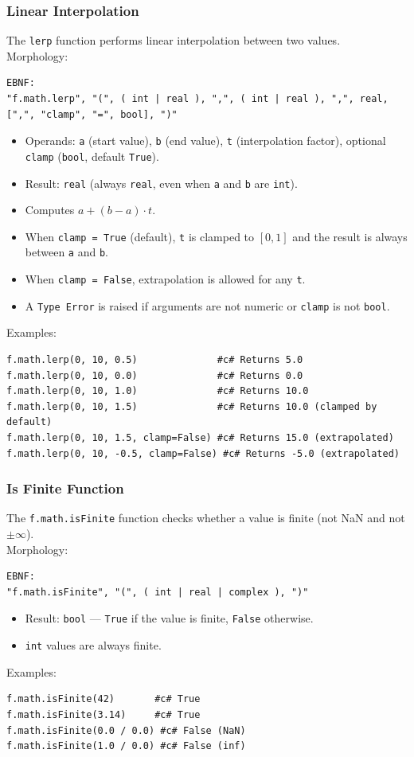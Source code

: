 \subsubsection{Linear Interpolation}
The \texttt{lerp} function performs linear interpolation between two values. \\
Morphology:
\begin{verbatim}
EBNF:
"f.math.lerp", "(", ( int | real ), ",", ( int | real ), ",", real, [",", "clamp", "=", bool], ")"
\end{verbatim}
\begin{itemize}
\item Operands: \texttt{a} (start value), \texttt{b} (end value), \texttt{t} (interpolation factor), optional \texttt{clamp} (\texttt{bool}, default \texttt{True}).
\item Result: \texttt{real} (always \texttt{real}, even when \texttt{a} and \texttt{b} are \texttt{int}).
\item Computes $a + (b - a) \cdot t$.
\item When \texttt{clamp = True} (default), \texttt{t} is clamped to $[0, 1]$ and the result is always between \texttt{a} and \texttt{b}.
\item When \texttt{clamp = False}, extrapolation is allowed for any \texttt{t}.
\item A \texttt{Type Error} is raised if arguments are not numeric or \texttt{clamp} is not \texttt{bool}.
\end{itemize}
Examples:
\begin{verbatim}
f.math.lerp(0, 10, 0.5)              #c# Returns 5.0
f.math.lerp(0, 10, 0.0)              #c# Returns 0.0
f.math.lerp(0, 10, 1.0)              #c# Returns 10.0
f.math.lerp(0, 10, 1.5)              #c# Returns 10.0 (clamped by default)
f.math.lerp(0, 10, 1.5, clamp=False) #c# Returns 15.0 (extrapolated)
f.math.lerp(0, 10, -0.5, clamp=False) #c# Returns -5.0 (extrapolated)
\end{verbatim}

\subsubsection{Is Finite Function}
The \texttt{f.math.isFinite} function checks whether a value is finite (not NaN and not $\pm\infty$). \\
Morphology:
\begin{verbatim}
EBNF:
"f.math.isFinite", "(", ( int | real | complex ), ")"
\end{verbatim}
\begin{itemize}
\item Result: \texttt{bool} --- \texttt{True} if the value is finite, \texttt{False} otherwise.
\item \texttt{int} values are always finite.
\end{itemize}
Examples:
\begin{verbatim}
f.math.isFinite(42)       #c# True
f.math.isFinite(3.14)     #c# True
f.math.isFinite(0.0 / 0.0) #c# False (NaN)
f.math.isFinite(1.0 / 0.0) #c# False (inf)
\end{verbatim}


